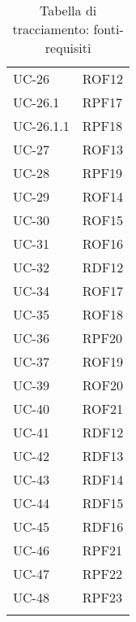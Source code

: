 \begin{longtable}{| p{5cm} | p{5cm} |}
		\rowcolor{LightGray}
		UC-26 & ROF12 \\
		UC-26.1 & RPF17 \\
		\rowcolor{LightGray}
		UC-26.1.1 & RPF18\\
		UC-27 & ROF13 \\
		\rowcolor{LightGray}
		UC-28 & RPF19 \\
		UC-29 & ROF14 \\
		\rowcolor{LightGray}
		UC-30 & ROF15 \\
		UC-31 & ROF16 \\
		\rowcolor{LightGray}
		UC-32 & RDF12\\
		UC-34 & ROF17\\
		\rowcolor{LightGray}
		UC-35 & ROF18\\
		UC-36 & RPF20\\
		\rowcolor{LightGray}
		UC-37 & ROF19\\
		UC-39 & ROF20\\
		\rowcolor{LightGray}
		UC-40 & ROF21\\
		UC-41 & RDF12\\
		\rowcolor{LightGray}
		UC-42 & RDF13\\
		UC-43 & RDF14\\
		\rowcolor{LightGray}
		UC-44 & RDF15\\
		UC-45 & RDF16\\
		\rowcolor{LightGray}
		UC-46 & RPF21\\
		UC-47 & RPF22\\
		\rowcolor{LightGray}
		UC-48 & RPF23\\
		\hline
		\caption{Tabella di tracciamento: fonti-requisiti}
\end{longtable}
\newpage
